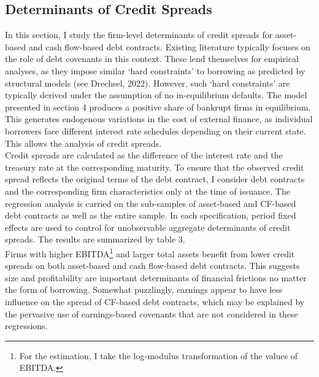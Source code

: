 \documentclass[12pt]{article}
\begin{document}
\subsection{Determinants of Credit Spreads \label{sec:credit spreads}} 
In this section, I study the firm-level determinants of credit spreads for asset-based and cash flow-based debt contracts. Existing literature typically focuses on the role of debt covenants in this context. These lend themselves for empirical analyses, as they impose similar `hard constraints' to borrowing as predicted by structural models (see Drechsel, 2022). However, such `hard constraints' are typically derived under the assumption of no in-equilibrium defaults. The model presented in section 4 produces a positive share of bankrupt firms in equilibrium. This generates endogenous variations in the cost of external finance, as individual borrowers face different interest rate schedules depending on their current state. This allows the analysis of credit spreads. \vspace{3mm} \\
Credit spreads are calculated as the difference of the interest rate and the treasury rate at the corresponding maturity. To ensure that the observed credit spread reflects the original terms of the debt contract, I consider debt contracts and the corresponding firm characteristics only at the time of issuance. The regression analysis is carried on the sub-samples of asset-based and CF-based debt contracts as well as the entire sample. In each specification, period fixed effects are used to control for unobservable aggregate determinants of credit spreads. The results are summarized by table 3. \vspace{3mm} \\
Firms with higher EBITDA\footnote{For the estimation, I take the log-modulus transformation of the values of EBITDA.} and larger total assets benefit from lower credit spreads on both asset-based and cash flow-based debt contracts. This suggests size and profitability are important determinants of financial frictions no matter the form of borrowing. Somewhat puzzlingly, earnings appear to have less influence on the spread of CF-based debt contracts, which may be explained by the pervasive use of earnings-based covenants that are not considered in these regressions.  \vspace{3mm} \\
\end{document}
